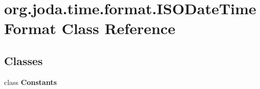 \hypertarget{classorg_1_1joda_1_1time_1_1format_1_1_i_s_o_date_time_format}{\section{org.\-joda.\-time.\-format.\-I\-S\-O\-Date\-Time\-Format Class Reference}
\label{classorg_1_1joda_1_1time_1_1format_1_1_i_s_o_date_time_format}
}
\subsection*{Classes}
\begin{DoxyCompactItemize}
\item 
class {\bfseries Constants}
\end{DoxyCompactItemize}
